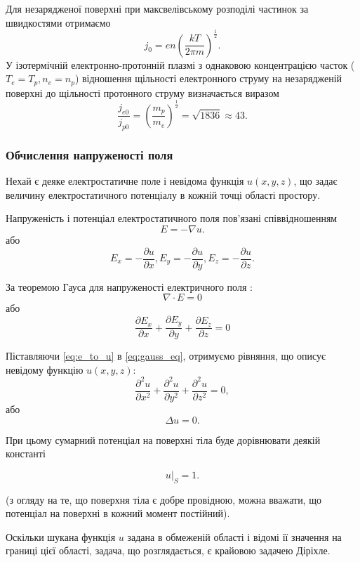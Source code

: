 \documentclass[a4paper,12pt]{article}
\begin{document}
Для незарядженої поверхні при максвелівському розподілі частинок за швидкостями отримаємо
\begin{equation} \label{eq:density}
j_0 = e n \left( \frac{kT}{2 \pi m} \right)^\frac{1}{2}.
\end{equation}
У ізотермічній електронно-протонній плазмі з однаковою концентрацією часток ($T_e = T_p, n_e = n_p$) відношення щільності електронного струму на незарядженій поверхні до щільності протонного струму визначається виразом \cite{novikov}
\[
\frac{j_{e0}}{j_{p0}} = \left( \frac{m_p}{m_e} \right)^\frac{1}{2} = \sqrt{1836} \approx 43.
\]

\subsubsection{Обчислення напруженості поля}

Нехай є деяке електростатичне поле і невідома функція $u(x,y,z)$, що задає величину електростатичного потенціалу в кожній точці області простору.

Напруженість і потенціал електростатичного поля пов’язані співвідношенням
\[
E = -\nabla u.
\]
або
\begin{equation} \label{eq:e_to_u}
E_x = -\frac{\partial u}{\partial x}, E_y = -\frac{\partial u}{\partial y}, E_z = -\frac{\partial u}{\partial z}.
\end{equation}

За теоремою Гауса для напруженості електричного поля \cite{magnet}:
\[
\nabla \cdot E = 0
\]
або
\begin{equation} \label{eq:gauss_eq}
\frac{\partial E_x}{\partial x} + \frac{\partial E_y}{\partial y} + \frac{\partial E_z}{\partial z} = 0
\end{equation}

Піставляючи \ref{eq:e_to_u} в \ref{eq:gauss_eq}, отримуємо рівняння, що описує невідому функцію $u(x,y,z)$:
\[
\frac{\partial ^2 u}{\partial x^2} + \frac{\partial ^2 u}{\partial y^2} + \frac{\partial ^2 u}{\partial z^2} = 0,
\] або
\[
\Delta u = 0.
\]

При цьому сумарний потенціал на поверхні тіла буде дорівнювати деякій константі

\[
\left.u\right|_S = 1.
\]

(з огляду на те, що поверхня тіла є добре провідною, можна вважати, що потенціал на поверхні в кожний момент постійний).

Оскільки шукана функція $u$ задана в обмеженій області і відомі її значення на границі цієї області, задача, що розглядається, є крайовою задачею Діріхле.
\end{document}
